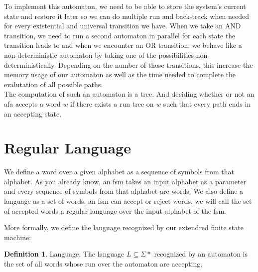 \documentclass[12pt]{article}
\theoremstyle{definition}
\newtheorem{definition}{Definition}[section]
\theoremstyle{definition}
\theoremstyle{remark}
\begin{document}
To implement this automaton, we need to be able to store the system's current state and restore it later so we can do multiple run and back-track when needed for every existential and universal transition we have. When we take an AND transition, we need to run a second automaton in parallel for each state the transition leads to and when we encounter an OR transition, we behave like a non-deterministic automaton by taking one of the possibilities non-deterministically. Depending on the number of those transitions, this increase the memory usage of our automaton as well as the time needed to complete the evalutation of all possible paths.\\

The computation of such an automaton is a tree. And deciding whether or not an \gls{afa} accepts a word $w$ if there exists a run tree on $w$ such that every path ends in an accepting state.~\cite{AFA:2017}\\



\section{Regular Language}


We define a word over a given alphabet as a sequence of symbols from that alphabet. As you already know, an \gls{fsm} takes an input alphabet as a parameter and every sequence of symbols from that alphabet are words. We also define a language as a set of words. an \gls{fsm} can accept or reject words, we will call the set of accepted words a regular language over the input alphabet of the \gls{fsm}.

More formally, we define the language recognized by our extendred finite state machine:
\theoremstyle{definition}
\begin{definition}{Language.} The language $L \subseteq \Sigma*$ recognized by an automaton is the set of all words whose run over the automaton are accepting.
\end{definition}
\end{document}
